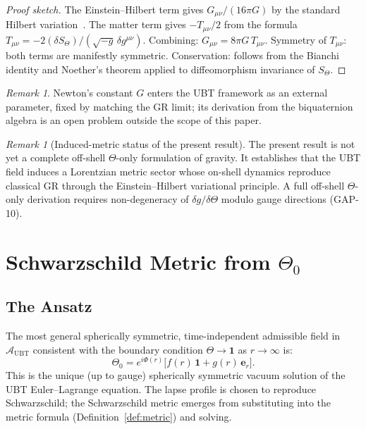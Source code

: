 \documentclass[12pt,a4paper]{article}
\theoremstyle{definition}
\theoremstyle{remark}
\newtheorem{remark}[theorem]{Remark}
\newcommand{\calA}{\mathcal{A}}
\begin{document}
\begin{proof}[Proof sketch]
The Einstein--Hilbert term gives $G_{\mu\nu}/(16\pi G)$ by the standard
Hilbert variation~\cite{hilbert1915,wald1984}.
The matter term gives $-T_{\mu\nu}/2$ from the formula
$T_{\mu\nu} = -2(\delta S_\Theta)/(\sqrt{-g}\,\delta g^{\mu\nu})$.
Combining: $G_{\mu\nu} = 8\pi G\,T_{\mu\nu}$.
Symmetry of $T_{\mu\nu}$: both terms are manifestly symmetric.
Conservation: follows from the Bianchi identity and Noether's theorem applied
to diffeomorphism invariance of $S_\Theta$.
\end{proof}

\begin{remark}
Newton's constant $G$ enters the UBT framework as an external parameter,
fixed by matching the GR limit; its derivation from the biquaternion algebra
is an open problem outside the scope of this paper.
\end{remark}

\begin{remark}[Induced-metric status of the present result]
The present result is not yet a complete off-shell $\Theta$-only formulation of
gravity. It establishes that the UBT field induces a Lorentzian metric sector
whose on-shell dynamics reproduce classical GR through the Einstein--Hilbert
variational principle. A full off-shell $\Theta$-only derivation requires
non-degeneracy of $\delta g/\delta\Theta$ modulo gauge directions (GAP-10).
\end{remark}

\section{Schwarzschild Metric from $\Theta_0$}
\label{sec:schwarzschild}

\subsection{The Ansatz}

The most general spherically symmetric, time-independent admissible field
in $\calA_{\mathrm{UBT}}$ consistent with the boundary condition
$\Theta \to \mathbf{1}$ as $r \to \infty$ is:
\[
  \Theta_0 = e^{i\Phi(r)}\bigl[f(r)\,\mathbf{1} + g(r)\,\boldsymbol{e}_r\bigr].
\]
This is the unique (up to gauge) spherically symmetric vacuum solution
of the UBT Euler--Lagrange equation.
The lapse profile is chosen to reproduce Schwarzschild;
the Schwarzschild metric emerges from substituting into the metric formula
(Definition~\ref{def:metric}) and solving.
\end{document}
